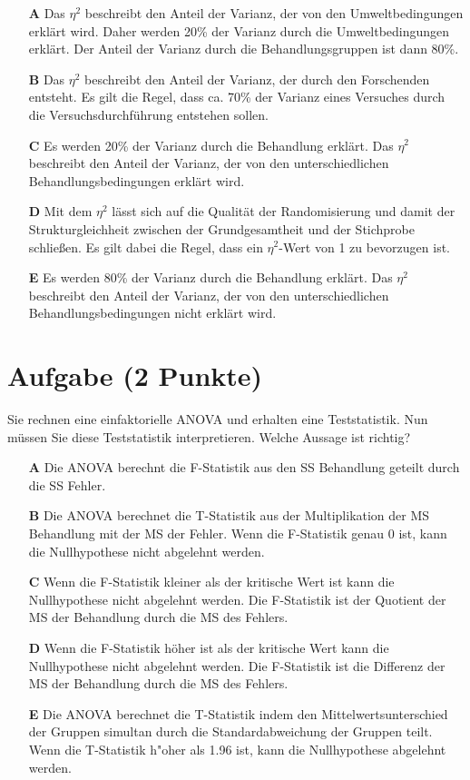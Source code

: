 \documentclass[a4paper, 9pt]{scrartcl}\usepackage[]{graphicx}\usepackage[]{xcolor}
\begin{document}
\begin{enumerate}
\item [\textbf{A} \msquare] Das $\eta^2$ beschreibt den Anteil der Varianz, der von den Umweltbedingungen erklärt wird. Daher werden 20\% der Varianz durch die Umweltbedingungen erklärt. Der Anteil der Varianz durch die Behandlungsgruppen ist dann 80\%.
\item [\textbf{B} \msquare] Das $\eta^2$ beschreibt den Anteil der Varianz, der durch den Forschenden entsteht. Es gilt die Regel, dass ca. 70\% der Varianz eines Versuches durch die Versuchsdurchführung entstehen sollen.
\item [\textbf{C} \msquare] Es werden 20\% der Varianz durch die Behandlung erklärt. Das $\eta^2$ beschreibt den Anteil der Varianz, der von den unterschiedlichen Behandlungsbedingungen erklärt wird.
\item [\textbf{D} \msquare] Mit dem $\eta^2$ lässt sich auf die Qualität der Randomisierung und damit der Strukturgleichheit zwischen der Grundgesamtheit und der Stichprobe schließen. Es gilt dabei die Regel, dass ein $\eta^2$-Wert von 1 zu bevorzugen ist.
\item [\textbf{E} \msquare] Es werden 80\% der Varianz durch die Behandlung erklärt. Das $\eta^2$ beschreibt den Anteil der Varianz, der von den unterschiedlichen Behandlungsbedingungen nicht erklärt wird.
\end{enumerate} 

\section{Aufgabe \hfill (2 Punkte)}



Sie rechnen eine einfaktorielle ANOVA und erhalten eine Teststatistik. Nun müssen Sie diese Teststatistik interpretieren. Welche Aussage ist richtig?



\begin{enumerate}
\item [\textbf{A} \msquare] Die ANOVA berechnt die F-Statistik aus den SS Behandlung geteilt durch die SS Fehler.
\item [\textbf{B} \msquare] Die ANOVA berechnet die T-Statistik aus der Multiplikation der MS Behandlung mit der MS der Fehler. Wenn die F-Statistik genau 0 ist, kann die Nullhypothese nicht abgelehnt werden.
\item [\textbf{C} \msquare] Wenn die F-Statistik kleiner als der kritische Wert ist kann die Nullhypothese nicht abgelehnt werden. Die F-Statistik ist der Quotient der MS der Behandlung durch die MS des Fehlers.
\item [\textbf{D} \msquare] Wenn die F-Statistik höher ist als der kritische Wert kann die Nullhypothese nicht abgelehnt werden. Die F-Statistik ist die Differenz der MS der Behandlung durch die MS des Fehlers.
\item [\textbf{E} \msquare] Die ANOVA berechnet die T-Statistik indem den Mittelwertsunterschied der Gruppen simultan durch die Standardabweichung der Gruppen teilt. Wenn die T-Statistik h{"o}her als 1.96 ist, kann die Nullhypothese abgelehnt werden.
\end{enumerate} 
\end{document}

